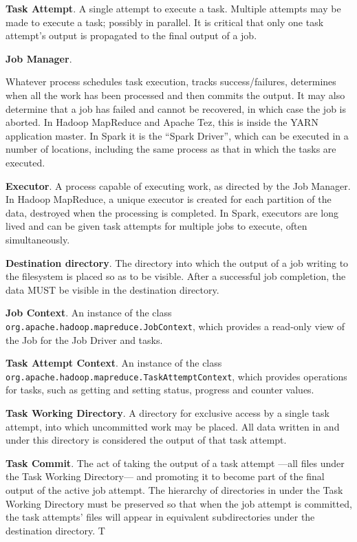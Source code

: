 \documentclass[conference]{IEEEtran}
\begin{document}
\textbf{Task Attempt}.
A single attempt to execute a task.
Multiple attempts may be made to execute a task;
possibly in parallel.
It is critical that only one task attempt's output is propagated
to the final output of a job.


\textbf{Job Manager}.

Whatever process schedules task execution, tracks success/failures,
determines when all the work has been processed and then commits the output.
It may also determine that a job has failed and cannot be recovered,
in which case the job is aborted.
In Hadoop MapReduce and Apache Tez, this is inside the YARN application master.
In Spark it is the ``Spark Driver'', which can be executed in a number of
locations, including the same process as that in which the tasks are executed.


\textbf{Executor}.
A process capable of executing work, as directed by the Job Manager.
In Hadoop MapReduce, a unique executor is created for each partition
of the data, destroyed when the processing is completed.
In Spark, executors are long lived and can be given task attempts for multiple
jobs to execute, often simultaneously.

\textbf{Destination directory}.
The directory into which the output of a job writing to the filesystem is placed
so as to be visible.
After a successful job completion, the data MUST be visible in the destination
directory.


\textbf{Job Context}.
An instance of the class \texttt{org.apache.hadoop.mapreduce.JobContext},
which provides a read-only view of the Job for the Job Driver and tasks.

\textbf{Task Attempt Context}.
An instance of the class
\texttt{org.apache.hadoop.mapreduce.TaskAttemptContext},
which provides operations for tasks, such as getting and setting status,
progress and counter values.

\textbf{Task Working Directory}.
A directory for exclusive access by a single task attempt, into which uncommitted
work may be placed.
All data written in and under this directory is considered the output of
that task attempt.


\textbf{Task Commit}.
The act of taking the output of a task attempt ---all files under the Task Working Directory---
and promoting it to become part of the final output of the active job
attempt.
The hierarchy of directories in under the Task Working Directory must be
preserved so that when the job attempt is committed, the task attempts' files
will appear in equivalent subdirectories under the destination directory.
T
\end{document}
